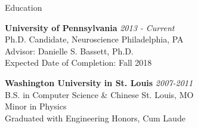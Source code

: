 \documentclass{resume} %
\begin{document}

\begin{rSection}{Education}

\textbf{University of Pennsylvania} \hfill \emph{2013 - Current} \\
Ph.D. Candidate, Neuroscience \hfill Philadelphia, PA \\
Advisor: Danielle S. Bassett, Ph.D. \\
Expected Date of Completion: Fall 2018

\textbf{Washington University in St. Louis} \hfill \emph{2007-2011} \\
B.S. in Computer Science \& Chinese \hfill St. Louis, MO \\
Minor in Physics \\
Graduated with Engineering Honors, Cum Laude

\end{rSection}

\end{document}
